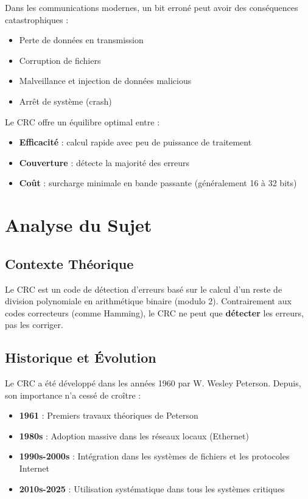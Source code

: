 \documentclass[12pt, a4paper]{article}
\begin{document}
Dans les communications modernes, un bit erroné peut avoir des conséquences catastrophiques :
\begin{itemize}
    \item Perte de données en transmission
    \item Corruption de fichiers
    \item Malveillance et injection de données malicious
    \item Arrêt de système (crash)
\end{itemize}

Le CRC offre un équilibre optimal entre :
\begin{itemize}
    \item \textbf{Efficacité} : calcul rapide avec peu de puissance de traitement
    \item \textbf{Couverture} : détecte la majorité des erreurs
    \item \textbf{Coût} : surcharge minimale en bande passante (généralement 16 à 32 bits)
\end{itemize}

\section{Analyse du Sujet}

\subsection{Contexte Théorique}

Le CRC est un code de détection d'erreurs basé sur le calcul d'un reste de division polynomiale en arithmétique binaire (modulo 2). Contrairement aux codes correcteurs (comme Hamming), le CRC ne peut que \textbf{détecter} les erreurs, pas les corriger.

\subsection{Historique et Évolution}

Le CRC a été développé dans les années 1960 par W. Wesley Peterson. Depuis, son importance n'a cessé de croître :
\begin{itemize}
    \item \textbf{1961} : Premiers travaux théoriques de Peterson
    \item \textbf{1980s} : Adoption massive dans les réseaux locaux (Ethernet)
    \item \textbf{1990s-2000s} : Intégration dans les systèmes de fichiers et les protocoles Internet
    \item \textbf{2010s-2025} : Utilisation systématique dans tous les systèmes critiques
\end{itemize}
\end{document}
